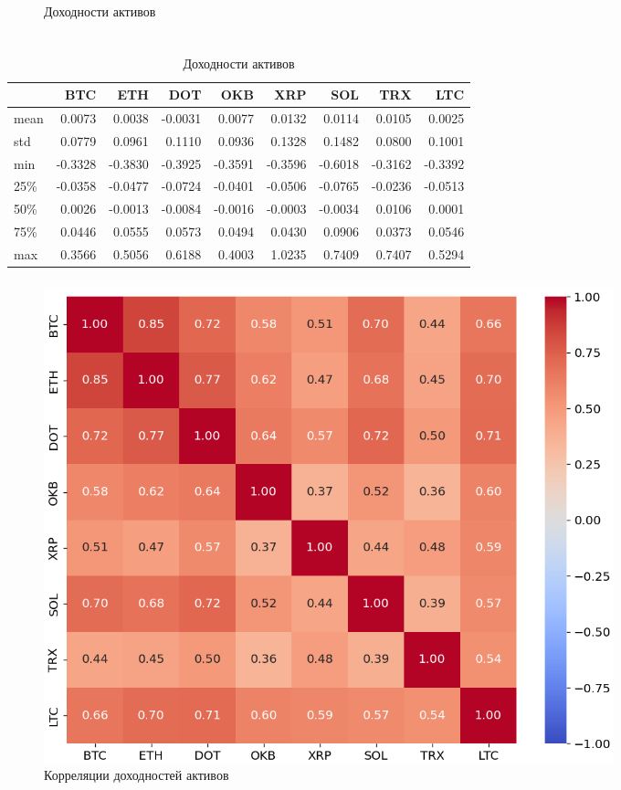 \documentclass{beamer}
\begin{document}
\begin{frame}
\begin{columns}
\begin{column}{0.5\textwidth}
\begin{figure}
                \caption{Доходности активов}
                \label{fig:returns}
            \end{figure}
        \end{column}
    \end{columns}
\end{frame}

\begin{frame}
    \frametitle{}
    \begin{table}[h]
        \caption{Доходности активов}
        \setlength{\tabcolsep}{3pt}
        \begin{tabularx}{\textwidth}{lrrrrrrrr}
            \toprule
            & BTC & ETH & DOT & OKB & XRP & SOL & TRX & LTC \\
            \midrule
            mean & 0.0073 & 0.0038 & -0.0031 & 0.0077 & 0.0132 & 0.0114 & 0.0105 & 0.0025 \\
            std & 0.0779 & 0.0961 & 0.1110 & 0.0936 & 0.1328 & 0.1482 & 0.0800 & 0.1001 \\
            min & -0.3328 & -0.3830 & -0.3925 & -0.3591 & -0.3596 & -0.6018 & -0.3162 & -0.3392 \\
            25\% & -0.0358 & -0.0477 & -0.0724 & -0.0401 & -0.0506 & -0.0765 & -0.0236 & -0.0513 \\
            50\% & 0.0026 & -0.0013 & -0.0084 & -0.0016 & -0.0003 & -0.0034 & 0.0106 & 0.0001 \\
            75\% & 0.0446 & 0.0555 & 0.0573 & 0.0494 & 0.0430 & 0.0906 & 0.0373 & 0.0546 \\
            max & 0.3566 & 0.5056 & 0.6188 & 0.4003 & 1.0235 & 0.7409 & 0.7407 & 0.5294 \\
            \bottomrule
        \end{tabularx}
        \label{tab:returns_describe}
    \end{table}
\end{frame}

\begin{frame}
    \frametitle{}
    \begin{figure}[H]
        \centering
        \includegraphics[width=0.8\textwidth]{corr_cut.png}
        \caption{Корреляции доходностей активов}
        \label{fig:corr}
    \end{figure}
\end{frame}
\end{document}
